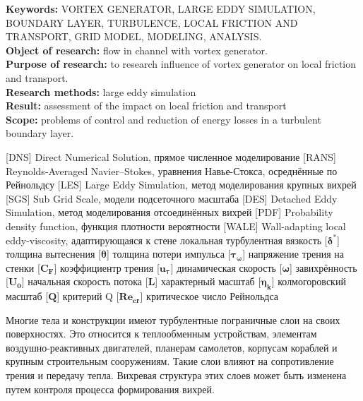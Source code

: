 \textbf{Keywords:} \MakeUppercase{vortex generator, large eddy simulation, boundary layer, turbulence, local friction and transport, grid model, modeling, analysis}.\\
\textbf{Object of research:} flow in channel with vortex generator.\\
\textbf{Purpose of research:} to research influence of vortex generator on local friction and transport.\\
\textbf{Research methods:} large eddy simulation\\
\textbf{Result:} assessment of the impact on local friction and transport\\
\textbf{Scope:} problems of control and reduction of energy losses in a turbulent boundary layer.\\
\newpage
{}
\begin{acronym}[RANS]
	   [DNS]   {Direct Numerical Solution, прямое численное моделирование}
	  [RANS]  {Reynolds-Averaged Navier–Stokes, уравнения Навье-Стокса, осреднённые по Рейнольдсу}
	   [LES]   {Large Eddy Simulation, метод моделирования крупных вихрей}
	   [SGS]   {Sub Grid Scale, модели подсеточного масштаба}
	   [DES]   {Detached Eddy Simulation, метод моделирования отсоединённых вихрей}
	   [PDF]   {Probability density function, функция плотности вероятности}
	  [WALE]  {Wall-adapting local eddy-viscosity, адаптирующаяся к стене локальная турбулентная вязкость}
	 [$\boldsymbol{\delta^*}$] {толщина вытеснения}
	 [$\boldsymbol{\theta}$] {толщина потери импульса}
	 [$\boldsymbol{\tau_\omega}$] {напряжение трения на стенки}
	 [$\boldsymbol{C_F}$] {коэффициентр трения}
	 [$\boldsymbol{u_\tau}$] {динамическая скорость}
	 [$\boldsymbol{\omega}$] {завихрённость}
	 [$\boldsymbol{U_0}$] {начальная скорость потока}
	  [$\boldsymbol{L}$] {характерный масштаб}
	 [$\boldsymbol{\eta_k}$] {колмогоровский масштаб}
	 [$\boldsymbol{Q}$] {критерий Q}
	 [$\boldsymbol{Re_{cr}}$] {критическое число Рейнольдса}
\end{acronym}
\newpage
{}
	
	‍Многие тела и конструкции имеют турбулентные пограничные слои на своих поверхностях. Это относится к теплообменным устройствам, элементам воздушно-реактивных двигателей, планерам самолетов, корпусам кораблей и крупным строительным сооружениям. Такие слои влияют на сопротивление трения и передачу тепла. Вихревая структура этих слоев может быть изменена путем контроля процесса формирования вихрей.
	
